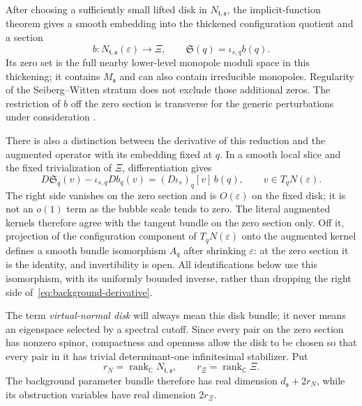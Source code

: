 \documentclass[11pt]{amsart}
\theoremstyle{definition}
\theoremstyle{remark}
\theoremstyle{plain}
\newcommand{\CC}{\mathbb{C}}
\newcommand{\rank}{\operatorname{rank}}
\begin{document}
After choosing a sufficiently small lifted disk in
$N_{\mathfrak t,\mathfrak s}$, the implicit-function theorem gives a smooth
embedding into the thickened configuration quotient and a section
\begin{equation}\label{eq:background-obstruction}
 b:N_{\mathfrak t,\mathfrak s}(\varepsilon)\longrightarrow\Xi,
 \qquad
 \mathfrak S(q)=\iota_{s,q}b(q).
\end{equation}
Its zero set is the full nearby lower-level monopole moduli space
in this thickening; it contains $M_{\mathfrak s}$ and can also contain
irreducible monopoles.  Regularity of the Seiberg--Witten stratum does not
exclude those additional zeros.  The restriction of $b$ off the zero
section is transverse for the generic perturbations under consideration
\cite[Theorem~3.21]{FeehanLenessTopLevel}.

There is also a distinction between the derivative of this reduction and
the augmented operator with its embedding fixed at $q$.  In a smooth local
slice and the fixed trivialization of $\Xi$, differentiation gives
\begin{equation}\label{eq:background-derivative}
 D\mathfrak S_q(v)-\iota_{s,q}Db_q(v)
 =(D\iota_s)_q[v]\,b(q),\qquad v\in T_qN(\varepsilon).
\end{equation}
The right side vanishes on the zero section and is $O(\varepsilon)$ on
the fixed disk; it is not an $o(1)$ term as the bubble scale tends to zero.
The literal augmented kernels therefore agree with the tangent bundle on
the zero section only.  Off it, projection of the configuration component
of $T_qN(\varepsilon)$ onto the augmented kernel defines a smooth bundle
isomorphism $A_q$ after shrinking $\varepsilon$: at the zero section it
is the identity, and invertibility is open.  All identifications below use
this isomorphism, with its uniformly bounded inverse, rather than dropping
the right side of~\eqref{eq:background-derivative}.

The term \emph{virtual-normal disk}
will always mean this disk bundle; it never means an eigenspace selected by
a spectral cutoff.  Since every pair on the zero section has nonzero spinor,
compactness and openness allow the disk to be chosen so that every pair in
it has trivial determinant-one infinitesimal stabilizer.  Put
\[
 r_N=\rank_{\CC}N_{\mathfrak t,\mathfrak s},\qquad
 r_\Xi=\rank_{\CC}\Xi.
\]
The background parameter bundle therefore has real dimension
$d_{\mathfrak s}+2r_N$, while its obstruction variables have real dimension
$2r_\Xi$.
\end{document}
